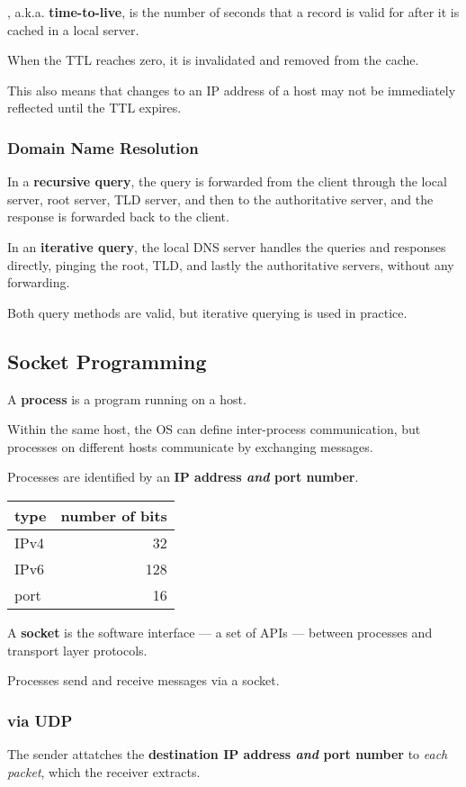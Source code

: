 , a.k.a. \textbf{time-to-live}, is the number of seconds that a record is valid for
after it is cached in a local server.

When the TTL reaches zero, it is invalidated and removed from the cache.

This also means that changes to an IP address of a host may not be immediately reflected
until the TTL expires.

\subsubsection{Domain Name Resolution}
In a \textbf{recursive query}, the query is forwarded from the client through the local server,
root server, TLD server, and then to the authoritative server, and the response is forwarded back 
to the client.

In an \textbf{iterative query}, the local DNS server handles the queries and responses directly,
pinging the root, TLD, and lastly the authoritative servers, without any forwarding.

Both query methods are valid, but iterative querying is used in practice.


\subsection{Socket Programming}
A \textbf{process} is a program running on a host.

Within the same host, the OS can define inter-process communication, but
processes on different hosts communicate by exchanging messages.

Processes are identified by an \textbf{IP address \emph{and} port number}.

\begin{tabular}{l|r}
    type & number of bits \\ \hline
    IPv4 & 32 \\
    IPv6 & 128 \\
    port & 16 \\ \hline
\end{tabular}

A \textbf{socket} is the software interface --- a set of APIs --- 
between processes and transport layer protocols.

Processes send and receive messages via a socket.

\subsubsection{via UDP}
The sender attatches the \textbf{destination IP address \emph{and} port number} to \emph{each packet},
which the receiver extracts.

